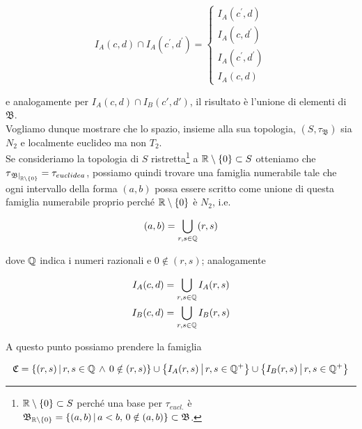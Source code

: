 \begin{equation}
	I_{A}(c,d) \cap I_{A}(c^{\prime},d^{\prime}) =%
		\begin{cases}
			I_{A}(c^{\prime},d)\\
			I_{A}(c,d^{\prime})\\
			I_{A}(c^{\prime},d^{\prime})\\
			I_{A}(c,d)
		\end{cases}
\end{equation}

e analogamente per $ I_{A}(c,d) \cap I_{B}(c',d') $, il risultato è l'unione di elementi di $ \mathfrak{B} $.\\
Vogliamo dunque mostrare che lo spazio, insieme alla sua topologia, $ (S,\tau_{\mathfrak{B}}) $ sia $ N_{2} $ e localmente euclideo ma non $ T_{2} $.\\
Se consideriamo la topologia di $ S $ ristretta\footnote{%
	$ \mathbb{R} \setminus \{0\} \subset S $ perché una base per $ \tau_{eucl.} $ è $ \mathfrak{B}_{\mathbb{R} \setminus \{0\}} = \left\{ (a,b) \, \middle| \, a<b, \, 0 \notin (a,b) \right\} \subset \mathfrak{B} $.%
} a $ \mathbb{R} \setminus \{0\} \subset S $ otteniamo che $ \tau_{\left. \mathfrak{B} \right|_{\mathbb{R} \setminus \{0\}}} = \tau_{euclidea} $, possiamo quindi trovare una famiglia numerabile tale che ogni intervallo della forma $ (a,b) $ possa essere scritto come unione di questa famiglia numerabile proprio perché $ \mathbb{R} \setminus \{0\} $ è $ N_{2} $, i.e.

\begin{equation}
	(a,b) = \bigcup_{r,s \in \mathbb{Q}} (r,s)
\end{equation}

dove $ \mathbb{Q} $ indica i numeri razionali e $ 0 \notin (r,s) $; analogamente

\begin{align}
	\begin{split}
		I_{A}(c,d) &= \bigcup_{r,s \in \mathbb{Q}} I_{A}(r,s)\\
		I_{B}(c,d) &= \bigcup_{r,s \in \mathbb{Q}} I_{B}(r,s)
	\end{split}
\end{align}

A questo punto possiamo prendere la famiglia

\begin{equation}
	\mathfrak{C} = \left\{ (r,s) \, \middle| \, r,s \in \mathbb{Q} \, \wedge \, 0 \notin (r,s) \right\} \cup \left\{ I_{A}(r,s) \, \middle| \, r,s \in \mathbb{Q}^{+} \right\} \cup \left\{ I_{B}(r,s) \, \middle| \, r,s \in \mathbb{Q}^{+} \right\}
\end{equation}

